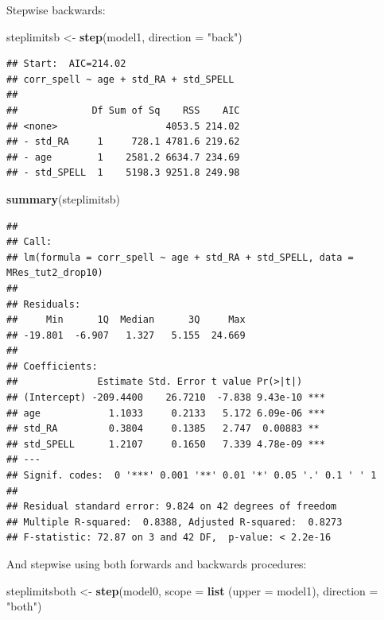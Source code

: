 \documentclass[
]{book}
\newenvironment{Shaded}{\begin{snugshade}}{\end{snugshade}}
\newcommand{\AttributeTok}[1]{\textcolor[rgb]{0.13,0.29,0.53}{#1}}
\newcommand{\FunctionTok}[1]{\textcolor[rgb]{0.13,0.29,0.53}{\textbf{#1}}}
\newcommand{\NormalTok}[1]{#1}
\newcommand{\OtherTok}[1]{\textcolor[rgb]{0.56,0.35,0.01}{#1}}
\newcommand{\StringTok}[1]{\textcolor[rgb]{0.31,0.60,0.02}{#1}}
\begin{document}
Stepwise backwards:

\begin{Shaded}
\begin{Highlighting}[]
\NormalTok{steplimitsb }\OtherTok{\textless{}{-}} \FunctionTok{step}\NormalTok{(model1, }\AttributeTok{direction =} \StringTok{"back"}\NormalTok{)}
\end{Highlighting}
\end{Shaded}

\begin{verbatim}
## Start:  AIC=214.02
## corr_spell ~ age + std_RA + std_SPELL
## 
##             Df Sum of Sq    RSS    AIC
## <none>                   4053.5 214.02
## - std_RA     1     728.1 4781.6 219.62
## - age        1    2581.2 6634.7 234.69
## - std_SPELL  1    5198.3 9251.8 249.98
\end{verbatim}

\begin{Shaded}
\begin{Highlighting}[]
\FunctionTok{summary}\NormalTok{(steplimitsb)}
\end{Highlighting}
\end{Shaded}

\begin{verbatim}
## 
## Call:
## lm(formula = corr_spell ~ age + std_RA + std_SPELL, data = MRes_tut2_drop10)
## 
## Residuals:
##     Min      1Q  Median      3Q     Max 
## -19.801  -6.907   1.327   5.155  24.669 
## 
## Coefficients:
##              Estimate Std. Error t value Pr(>|t|)    
## (Intercept) -209.4400    26.7210  -7.838 9.43e-10 ***
## age            1.1033     0.2133   5.172 6.09e-06 ***
## std_RA         0.3804     0.1385   2.747  0.00883 ** 
## std_SPELL      1.2107     0.1650   7.339 4.78e-09 ***
## ---
## Signif. codes:  0 '***' 0.001 '**' 0.01 '*' 0.05 '.' 0.1 ' ' 1
## 
## Residual standard error: 9.824 on 42 degrees of freedom
## Multiple R-squared:  0.8388, Adjusted R-squared:  0.8273 
## F-statistic: 72.87 on 3 and 42 DF,  p-value: < 2.2e-16
\end{verbatim}

And stepwise using both forwards and backwards procedures:

\begin{Shaded}
\begin{Highlighting}[]
\NormalTok{steplimitsboth }\OtherTok{\textless{}{-}} \FunctionTok{step}\NormalTok{(model0, }\AttributeTok{scope =} \FunctionTok{list}\NormalTok{ (}\AttributeTok{upper =}\NormalTok{ model1), }\AttributeTok{direction =} \StringTok{"both"}\NormalTok{)}
\end{Highlighting}
\end{Shaded}
\end{document}

